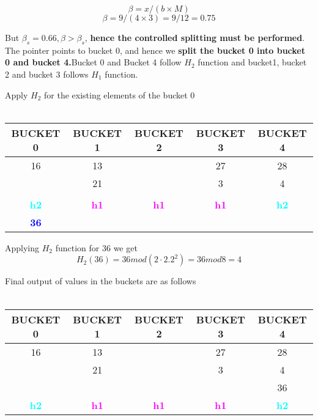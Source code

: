 \[\beta = x/(b \times M)\]
\[\beta = 9/(4 \times 3) = 9/12 = 0.75\]

But $\beta_s = 0.66 , \beta>\beta_s$,\textbf{ hence the controlled splitting must be performed}. The pointer points to bucket 0, and hence we \textbf{split the bucket 0 into bucket 0 and bucket 4.}Bucket 0 and Bucket 4 follow $H_2$ function and bucket1, bucket 2 and bucket 3 follows $H_1$ function.

Apply $H_2$ for the existing elements of the bucket 0
\\
\\
\begin{center}
\begin{tabular}{ |c|c|c|c|c|} 
 \hline
  BUCKET 0 & \textbf{\color{red}{P}} BUCKET 1 & BUCKET 2 & BUCKET 3 & BUCKET 4\\ [0.5ex] 
 \hline\hline
 \hline
  16 & 13 &  & 27& 28\\ 
    & 21 &  & 3& 4\\
     &  &  &  &\\
 \hline
 \hline
\textbf{\textcolor{cyan}{h2}} & \textbf{\textcolor{magenta}{h1}}& \textbf{\textcolor{magenta}{h1}}&\textbf{\textcolor{magenta}{h1}}&\textbf{\textcolor{cyan}{h2}}\\ [0.5ex] 
 \hline
 \textbf{\textcolor{blue}{36}}
\end{tabular}
\end{center}

Applying $H_2$ function for 36 we get
\[H_2(36) = 36 mod (2 \cdot 2.2^2)  = 36 mod 8 = 4\]

Final output of values in the buckets are as follows
\\
\\
\begin{center}
\begin{tabular}{ |c|c|c|c|c|} 
 \hline
  BUCKET 0 & \textbf{\color{red}{P}} BUCKET 1 & BUCKET 2 & BUCKET 3 & BUCKET 4\\ [0.5ex] 
 \hline\hline
 \hline
  16 & 13 &  & 27& 28\\ 
    & 21 &  & 3& 4\\
     &  &  &  &36\\
 \hline
 \hline
\textbf{\textcolor{cyan}{h2}} & \textbf{\textcolor{magenta}{h1}}& \textbf{\textcolor{magenta}{h1}}&\textbf{\textcolor{magenta}{h1}}&\textbf{\textcolor{cyan}{h2}}\\ [0.5ex] 
 \hline
\end{tabular}
\end{center}


